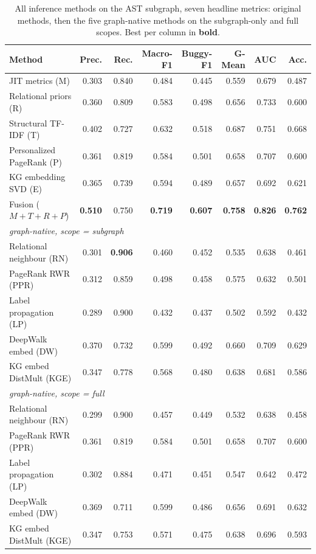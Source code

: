 \documentclass[11pt,a4paper]{article}
\begin{document}
	\begin{table}[t]
	\centering
	\caption{All inference methods on the AST subgraph, seven headline metrics:
	original methods, then the five graph-native methods on the subgraph-only and
	full scopes. Best per column in \textbf{bold}.}
	\label{tab:v4-metrics-allmethods}
	\small
	\begin{tabular}{lrrrrrrr}
	\toprule
	Method & Prec. & Rec. & Macro-F1 & Buggy-F1 & G-Mean & AUC & Acc. \\
	\midrule
	JIT metrics (M)            & 0.303 & 0.840 & 0.484 & 0.445 & 0.559 & 0.679 & 0.487 \\
	Relational priors (R)      & 0.360 & 0.809 & 0.583 & 0.498 & 0.656 & 0.733 & 0.600 \\
	Structural TF-IDF (T)      & 0.402 & 0.727 & 0.632 & 0.518 & 0.687 & 0.751 & 0.668 \\
	Personalized PageRank (P)  & 0.361 & 0.819 & 0.584 & 0.501 & 0.658 & 0.707 & 0.600 \\
	KG embedding SVD (E)       & 0.365 & 0.739 & 0.594 & 0.489 & 0.657 & 0.692 & 0.621 \\
	Fusion ($M{+}T{+}R{+}P$)   & \textbf{0.510} & 0.750 & \textbf{0.719} & \textbf{0.607} & \textbf{0.758} & \textbf{0.826} & \textbf{0.762} \\
	\midrule
	\multicolumn{8}{l}{\emph{graph-native, scope = subgraph}} \\
	Relational neighbour (RN)  & 0.301 & \textbf{0.906} & 0.460 & 0.452 & 0.535 & 0.638 & 0.461 \\
	PageRank RWR (PPR)         & 0.312 & 0.859 & 0.498 & 0.458 & 0.575 & 0.632 & 0.501 \\
	Label propagation (LP)     & 0.289 & 0.900 & 0.432 & 0.437 & 0.502 & 0.592 & 0.432 \\
	DeepWalk embed (DW)        & 0.370 & 0.732 & 0.599 & 0.492 & 0.660 & 0.709 & 0.629 \\
	KG embed DistMult (KGE)    & 0.347 & 0.778 & 0.568 & 0.480 & 0.638 & 0.681 & 0.586 \\
	\midrule
	\multicolumn{8}{l}{\emph{graph-native, scope = full}} \\
	Relational neighbour (RN)  & 0.299 & 0.900 & 0.457 & 0.449 & 0.532 & 0.638 & 0.458 \\
	PageRank RWR (PPR)         & 0.361 & 0.819 & 0.584 & 0.501 & 0.658 & 0.707 & 0.600 \\
	Label propagation (LP)     & 0.302 & 0.884 & 0.471 & 0.451 & 0.547 & 0.642 & 0.472 \\
	DeepWalk embed (DW)        & 0.369 & 0.711 & 0.599 & 0.486 & 0.656 & 0.691 & 0.632 \\
	KG embed DistMult (KGE)    & 0.347 & 0.753 & 0.571 & 0.475 & 0.638 & 0.696 & 0.593 \\
	\bottomrule
	\end{tabular}
	\end{table}
\end{document}
